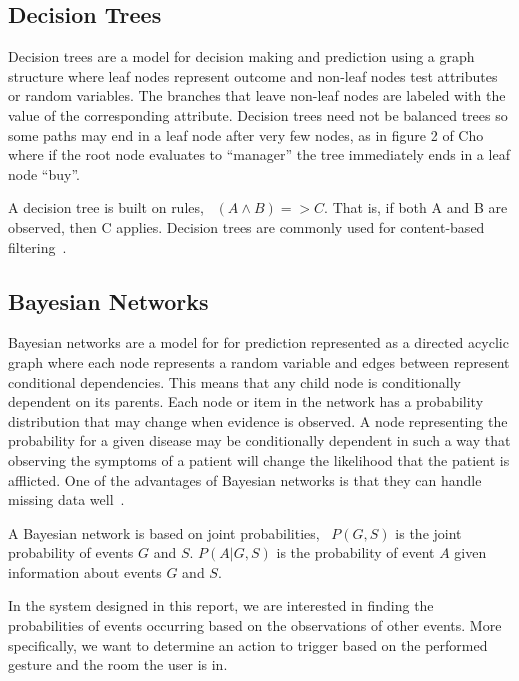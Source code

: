 
\subsection{Decision Trees}
\label{sec:analysis:recommender-methods:decision-trees}

Decision trees are a model for decision making and prediction using a graph structure where leaf nodes represent outcome and non-leaf nodes test attributes or random variables.
The branches that leave non-leaf nodes are labeled with the value of the corresponding attribute.
Decision trees need not be balanced trees so some paths may end in a leaf node after very few nodes, as in figure 2 of Cho \etal\cite{cho2002personalized} where if the root node evaluates to ``manager'' the tree immediately ends in a leaf node ``buy''.

A decision tree is built on rules, \eg~$(A \wedge B) => C$. That is, if both A and B are observed, then C applies. Decision trees are commonly used for content-based filtering~\cite{adomavicius2005toward}.

\subsection{Bayesian Networks}
\label{sec:analysis:recommender-methods:bayesian-networks}

Bayesian networks are a model for for prediction represented as a directed acyclic graph where each node represents a random variable and edges between represent conditional dependencies.
This means that any child node is conditionally dependent on its parents.
Each node or item in the network has a probability distribution that may change when evidence is observed.
A node representing the probability for a given disease may be conditionally dependent in such a way that observing the symptoms of a patient will change the likelihood that the patient is afflicted.
One of the advantages of Bayesian networks is that they can handle missing data well~\cite{heckerman2008tutorial}. 

A Bayesian network is based on joint probabilities, \eg~$P(G,S)$ is the joint probability of events $G$ and $S$. $P(A|G,S)$ is the probability of event $A$ given information about events $G$ and $S$.

In the system designed in this report, we are interested in finding the probabilities of events occurring based on the observations of other events. More specifically, we want to determine an action to trigger based on the performed gesture and the room the user is in.

